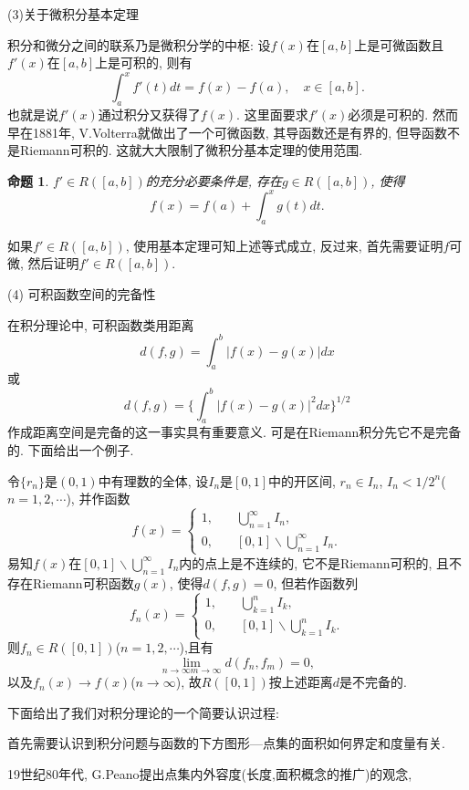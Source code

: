\documentclass[12pt,a4paper,openany]{book}
\newtheorem{proposition}{命题}[section]
\begin{document}
(3)关于微积分基本定理

积分和微分之间的联系乃是微积分学的中枢: 设$f(x)$在$[a, b]$上是可微函数且$f'(x)$在$[a, b]$上是可积的, 则有
$$
\int_{a}^{x}{f'(t)dt} = f(x) - f(a), \quad x \in [a, b].
$$
也就是说$f'(x)$通过积分又获得了$f(x)$. 这里面要求$f'(x)$必须是可积的. 然而早在1881年, V.Volterra就做出了一个可微函数, 其导函数还是有界的, 但导函数不是Riemann可积的. 这就大大限制了微积分基本定理的使用范围. 

\begin{proposition}
$f' \in R([a, b])$的充分必要条件是, 存在$g \in R([a, b])$, 使得
$$
f(x) = f(a) + \int_{a}^{x}{g(t)dt}.
$$
\end{proposition}

如果$f' \in R([a, b])$, 使用基本定理可知上述等式成立, 反过来, 首先需要证明$f$可微, 然后证明$f' \in R([a, b])$.

(4) 可积函数空间的完备性

在积分理论中, 可积函数类用距离
$$
d(f,g) = \int_{a}^{b}{|f(x) - g(x)|dx}
$$
或
$$
d(f,g) = \{ \int_{a}^{b}{|f(x) - g(x)|^2dx} \}^{1/2}
$$
作成距离空间是完备的这一事实具有重要意义. 可是在Riemann积分先它不是完备的. 下面给出一个例子.

令$\{r_n\}$是$(0, 1)$中有理数的全体, 设$I_n$是$[0, 1]$中的开区间, $r_n \in I_n$, $I_n < 1 / 2^n$($n=1,2,\cdots$), 并作函数
$$
f(x) = \left\{
\begin{aligned}
1, \quad &\bigcup_{n=1}^{\infty}{I_n}, \\
0, \quad &[0,1]\backslash \bigcup_{n=1}^{\infty}{I_n}.
\end{aligned}
\right.
$$
易知$f(x)$在$[0,1]\backslash\bigcup_{n=1}^{\infty}{I_n}$内的点上是不连续的, 它不是Riemann可积的, 且不存在Riemann可积函数$g(x)$, 使得$d(f,g) = 0$, 但若作函数列
$$
f_n(x) = \left\{
\begin{aligned}
1, \quad &\bigcup_{k=1}^{n}{I_k}, \\
0, \quad &[0,1]\backslash \bigcup_{k=1}^{n}{I_k}.
\end{aligned}
\right.
$$
则$f_n \in R([0,1])$($n=1,2,\cdots$),且有
$$
\lim_{n \rightarrow \infty m \rightarrow \infty}{d(f_n, f_m)} = 0,
$$
以及$f_n(x) \rightarrow f(x)$($n \rightarrow \infty$), 故$R([0, 1])$按上述距离$d$是不完备的.

下面给出了我们对积分理论的一个简要认识过程:

首先需要认识到积分问题与函数的下方图形---点集的面积如何界定和度量有关.

19世纪80年代, G.Peano提出点集内外容度(长度,面积概念的推广)的观念,
\end{document}

